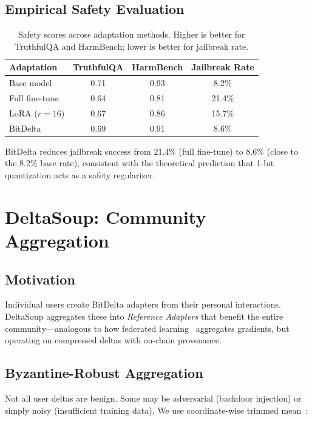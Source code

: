 \documentclass[11pt,letterpaper]{article}
\begin{document}
\subsection{Empirical Safety Evaluation}

\begin{table}[t]
\centering
\begin{tabular}{lccc}
\toprule
\textbf{Adaptation} & \textbf{TruthfulQA} & \textbf{HarmBench} & \textbf{Jailbreak Rate} \\
\midrule
Base model & 0.71 & 0.93 & 8.2\% \\
Full fine-tune & 0.64 & 0.81 & 21.4\% \\
LoRA ($r=16$) & 0.67 & 0.86 & 15.7\% \\
BitDelta & 0.69 & 0.91 & 8.6\% \\
\bottomrule
\end{tabular}
\caption{Safety scores across adaptation methods. Higher is better for TruthfulQA and HarmBench; lower is better for jailbreak rate.}
\label{tab:safety}
\end{table}

BitDelta reduces jailbreak success from 21.4\% (full fine-tune) to 8.6\% (close to the 8.2\% base rate), consistent with the theoretical prediction that 1-bit quantization acts as a safety regularizer.

\section{DeltaSoup: Community Aggregation}
\label{sec:deltasoup}

\subsection{Motivation}

Individual users create BitDelta adapters from their personal interactions. DeltaSoup aggregates these into \emph{Reference Adapters} that benefit the entire community---analogous to how federated learning~\cite{mcmahan2017federated} aggregates gradients, but operating on compressed deltas with on-chain provenance.

\subsection{Byzantine-Robust Aggregation}

Not all user deltas are benign. Some may be adversarial (backdoor injection) or simply noisy (insufficient training data). We use coordinate-wise trimmed mean~\cite{blanchard2017machine}:
\end{document}
